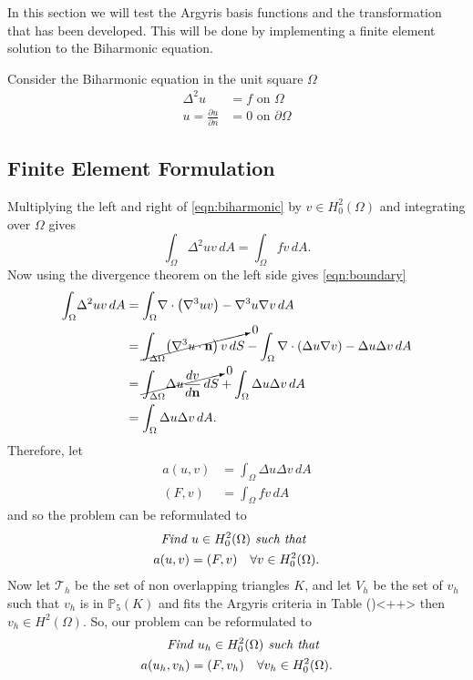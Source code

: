 In this section we will test the Argyris basis functions and the transformation
that has been developed. This will be done by implementing a finite element
solution to the Biharmonic equation.

Consider the Biharmonic equation in the unit square $\Omega$
\begin{subequations} \label{eqn:problem}
\begin{align}
	\Delta^2 u &= f \text{ on } \Omega \label{eqn:biharmonic}\\
	u= \frac{\partial u}{\partial n} &= 0 \text{ on } \partial \Omega
	\label{eqn:boundary}
\end{align}
\end{subequations}
\subsection{Finite Element Formulation}
Multiplying the left and right of \eqref{eqn:biharmonic} by $v\in
H^{2}_0(\Omega)$ and integrating over $\Omega$ gives
\begin{equation*}
	\int_{\Omega}\! \Delta^2 u v \,dA = \int_{\Omega}\! fv \,dA.
\end{equation*}
Now using the divergence theorem on the left side gives
\eqref{eqn:boundary}
\begin{align*}
	\int_{\Omega}\! \Delta^2 u v \,dA & = \int_{\Omega}\! \nabla \cdot
		\left( \nabla^3 u v \right) - \nabla^3 u \nabla v \,dA \\
  &= \cancelto{0}{\int_{\Delta\Omega}\! \left(\nabla^3 u \cdot \mathbf{n}\right) v \,dS} -
    \int_{\Omega} \nabla \cdot \left(\Delta u \nabla v\right) - \Delta u \Delta v \,dA \\
  &= \cancelto{0}{\int_{\Delta\Omega}\! \Delta u \frac{dv}{d\mathbf{n}} \,dS} +
    \int_{\Omega} \Delta u \Delta v \,dA \\
  &= \int_{\Omega} \Delta u \Delta v \,dA.
\end{align*}
Therefore, let 
\begin{align*}
	a(u,v) &= \int_{\Omega}\! \Delta u \Delta v \,dA \\
	(F,v) &= \int_{\Omega}\! fv \,dA
\end{align*}
and so the problem can be reformulated to 
\begin{equation}
	\begin{split}
	\text{\emph{Find $u \in H^2_0(\Omega)$ such that}}\quad \\ 
	a(u,v) = (F,v) \quad \forall v \in H^2_0(\Omega).
	\end{split}
\end{equation}
Now let $\mathcal{T}_h$ be the set of non overlapping triangles $K$, and let
$V_h$ be the set of $v_h$ such that $v_h$ is in $\mathbb{P}_5(K)$ and fits the
Argyris criteria in Table ()<++> then $v_h \in H^2(\Omega)$. So,
our problem can be reformulated to
\begin{equation}
	\begin{split}
	\text{\emph{Find $u_h \in H^2_0(\Omega)$ such that}}\quad \\ 
	a(u_h,v_h) = (F,v_h) \quad \forall v_h \in H^2_0(\Omega).
	\end{split}
\end{equation}

